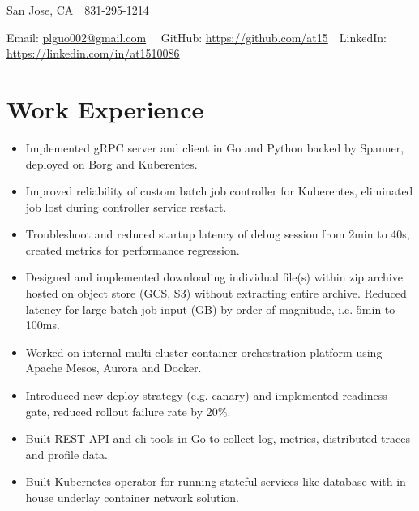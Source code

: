 \documentclass[11pt, letterpaper]{simple-cv}
\begin{document}
\centerline{
	San Jose, CA\ \
	831-295-1214\ \
}
\centerline{
	Email: \href{plguo002@gmail.com}{plguo002@gmail.com}\ \
	GitHub: \href{https://github.com/at15}{https://github.com/at15}\ \
	LinkedIn: \href{https://www.linkedin.com/in/at1510086}{https://linkedin.com/in/at1510086}}

\section{Work Experience}

\begin{itemize}
	\item Implemented gRPC server and client in Go and Python backed by Spanner, deployed on Borg and Kuberentes.
	\item Improved reliability of custom batch job controller for Kuberentes, eliminated job lost during controller service restart.
	\item Troubleshoot and reduced startup latency of debug session from 2min to 40s, created metrics for performance regression.
	\item Designed and implemented downloading individual file(s) within zip archive hosted on object store (GCS, S3) without extracting entire archive.
	Reduced latency for large batch job input (GB) by order of magnitude, i.e. 5min to 100ms.
\end{itemize}

\begin{itemize}
	\item Worked on internal multi cluster container orchestration platform using Apache Mesos, Aurora and Docker.
	\item Introduced new deploy strategy (e.g. canary) and implemented readiness gate, reduced rollout failure rate by 20\%.
	\item Built REST API and cli tools in Go to collect log, metrics, distributed traces and profile data.
	\item Built Kubernetes operator for running stateful services like database with in house underlay container network solution.
\end{itemize}
\end{document}
